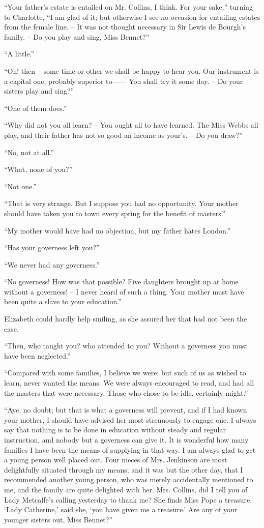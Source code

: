 “Your father’s estate is entailed on Mr. Collins, I think.
For your sake,” turning to Charlotte, “I am glad of it;
but otherwise I see no occasion for entailing estates from
the female line. -- It was not thought necessary in Sir
Lewis de Bourgh’s family. -- Do you play and sing, Miss
Bennet?”

“A little.”

“Oh! then -- some time or other we shall be happy to
hear you. Our instrument is a capital one, probably
superior to------ You shall try it some day. -- Do your sisters
play and sing?”

“One of them does.”

“Why did not you all learn? -- You ought all to have
learned. The Miss Webbs all play, and their father has
not so good an income as your’s. -- Do you draw?”

“No, not at all.”

“What, none of you?”

“Not one.”

“That is very strange. But I suppose you had no
opportunity. Your mother should have taken you to
town every spring for the benefit of masters.”

“My mother would have had no objection, but my
father hates London.”

“Has your governess left you?”

“We never had any governess.”

“No governess! How was that possible? Five
daughters brought up at home without a governess! -- I
never heard of such a thing. Your mother must have
been quite a slave to your education.”

Elizabeth could hardly help smiling, as she assured her
that had not been the case.

“Then, who taught you? who attended to you?
Without a governess you must have been neglected.”

“Compared with some families, I believe we were;
but such of us as wished to learn, never wanted the
means. We were always encouraged to read, and had
all the masters that were necessary. Those who chose
to be idle, certainly might.”

“Aye, no doubt; but that is what a governess will
prevent, and if I had known your mother, I should have
advised her most strenuously to engage one. I always
say that nothing is to be done in education without steady
and regular instruction, and nobody but a governess can
give it. It is wonderful how many families I have been
the means of supplying in that way. I am always glad
to get a young person well placed out. Four nieces of
Mrs. Jenkinson are most delightfully situated through my
means; and it was but the other day, that I recommended
another young person, who was merely accidentally mentioned
to me, and the family are quite delighted with her.
Mrs. Collins, did I tell you of Lady Metcalfe’s calling
yesterday to thank me? She finds Miss Pope a treasure.
‘Lady Catherine,’ said she, ‘you have given me a treasure.’
Are any of your younger sisters out, Miss Bennet?”

